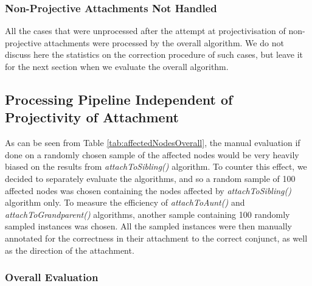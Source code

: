\subsubsection{Non-Projective Attachments Not Handled}

All the cases that were unprocessed after the attempt at projectivisation of non-projective attachments were processed by the overall algorithm. We do not discuss here the statistics on the correction procedure of such cases, but leave it for the next section when we evaluate the overall algorithm. 

\subsection{Processing Pipeline Independent of Projectivity of Attachment}

As can be seen from Table \ref{tab:affectedNodesOverall}, the manual evaluation if done on a randomly chosen sample of the affected nodes would be very heavily biased on the results from \textit{attachToSibling()} algorithm. To counter this effect, we decided to separately evaluate the algorithms, and so a random sample of 100 affected nodes was chosen containing the nodes affected by \textit{attachToSibling()} algorithm only. To measure the efficiency of \textit{attachToAunt()} and \textit{attachToGrandparent()} algorithms, another sample containing 100 randomly sampled instances was chosen. All the sampled instances were then manually annotated for the correctness in their attachment to the correct conjunct, as well as the direction of the attachment.

\begin{table}[H]
    \centering
    \caption{Nodes Affected: Overall}
    \label{tab:affectedNodesOverall}
\end{table}

\subsubsection{Overall Evaluation}

